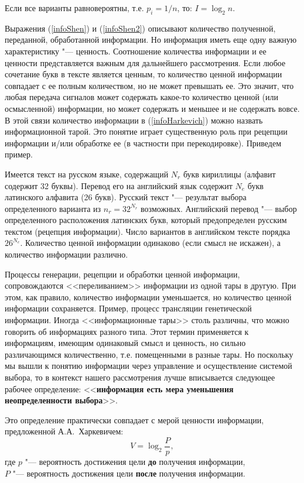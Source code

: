\documentclass[12pt,a4paper,oneside]{book}
\begin{document}
Если все варианты равновероятны, т.е. $p_i = 1 / n$, то: $I = \log_2 n$.

Выражения (\ref{infoShen}) и (\ref{infoShen2}) описывают количество полученной, переданной, обработанной информации. Но информация иметь еще одну важную характеристику "--- ценность. Соотношение количества информации и ее ценности представляется важным для дальнейшего рассмотрения. Если любое сочетание букв в тексте является ценным, то количество ценной информации совпадает с ее полным количеством, но не может превышать ее. Это значит, что любая передача сигналов может содержать какое-то количество ценной (или осмысленной) информации, но может содержать и меньшее и не содержать вовсе. В этой связи количество информации в (\ref{infoHarkevich}) можно назвать информационной тарой. Это понятие играет существенную роль при рецепции информации и/или обработке ее (в частности при перекодировке). Приведем пример.

Имеется текст на русском языке, содержащий $N_r$ букв кириллицы (алфавит содержит 32 буквы). Перевод его на английский язык содержит $N_e$ букв латинского алфавита (26 букв). Русский текст "--- результат выбора определенного варианта из $n_r = 32^{N_r}$ возможных. Английский перевод "--- выбор определенного расположения латинских букв, который предопределен русским текстом (рецепция информации). Число вариантов в английском тексте порядка $26^{N_e}$. Количество ценной информации одинаково (если смысл не искажен), а количество информации различно. 

Процессы генерации, рецепции и обработки ценной информации, сопровождаются <<переливанием>> информации из одной тары в другую. При этом, как правило, количество информации уменьшается, но количество ценной информации сохраняется. Пример, процесс трансляции генетической информации. Иногда <<информационные тары>> столь различны, что можно говорить об информациях разного типа. Этот термин применяется к информациям, имеющим одинаковый смысл и ценность, но сильно различающимся количественно, т.е. помещенными в разные тары. 
Но поскольку мы вышли к понятию информации через управление и осуществление системой выбора, то в контекст нашего рассмотрения лучше вписывается следующее рабочее определение: <<{\bf информация есть мера уменьшения неопределенности выбора}>>.

Это определение практически совпадает с мерой ценности информации, предложенной А.А.~Харкевичем:
\begin{equation}
	\label{infoHarkevich}
	V = \log_2 \frac{P}{p},
\end{equation}
где $p$ "--- вероятность достижения цели {\bf до} получения информации,\\
$P$ "--- вероятность достижения цели {\bf после} получения информации.
\end{document}

